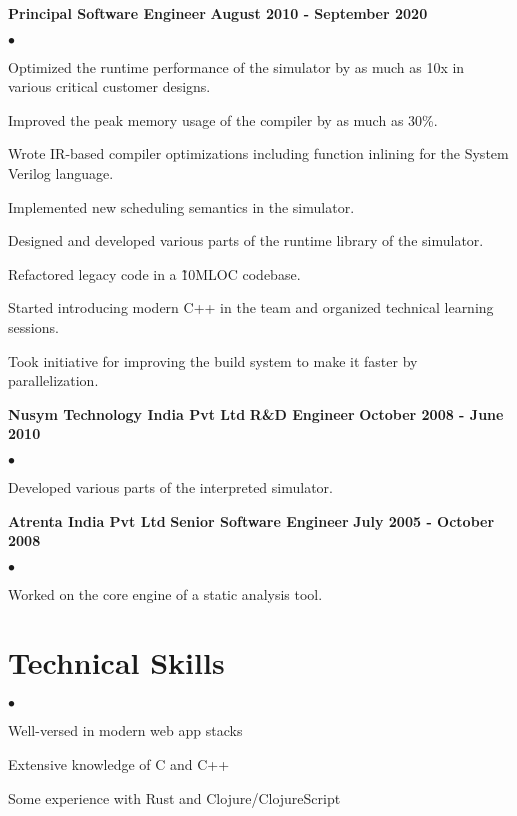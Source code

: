 \documentclass[margin,line]{res}
\newenvironment{list1}{
  \begin{list}{$\bullet$}{%
      \setlength{\itemsep}{0in}
      \setlength{\parsep}{0in} \setlength{\parskip}{0in}
      \setlength{\topsep}{0in} \setlength{\partopsep}{0in}
      \setlength{\leftmargin}{0.17in}}}{\end{list}}
\begin{document}
\begin{resume}
{\bf Principal Software Engineer}
\hfill{\bf August 2010 - September 2020} \\
\begin{list1} %
		\item Optimized the runtime performance of the simulator by as much as 10x in various critical customer designs.
		\item Improved the peak memory usage of the compiler by as much as 30\%.
		\item Wrote IR-based compiler optimizations including function inlining for the System Verilog language.
		\item Implemented new scheduling semantics in the simulator.
		\item Designed and developed various parts of the runtime library of the simulator.
		\item Refactored legacy code in a \~10MLOC codebase.
   		\item Started introducing modern C++ in the team and organized technical learning sessions.
   		\item Took initiative for improving the build system to make it faster by parallelization.
\end{list1}

{\bf  Nusym Technology India Pvt Ltd}
\hfill {\bf R\&D Engineer}
\hfill{\bf October 2008 - June 2010}
\vspace{.05in}
\begin{list1} %
	\item Developed various parts of the interpreted simulator.
\end{list1}
{\bf  Atrenta India Pvt Ltd}
\hfill {\bf Senior Software Engineer}
\hfill{\bf July 2005 - October 2008}
\vspace{.05in}
\begin{list1} %
\item Worked on the core engine of a static analysis tool.
\end{list1}

\section{\sc Technical Skills}
\begin{list1}
	\item Well-versed in modern web app stacks
	\item Extensive knowledge of C and C++
	\item Some experience with Rust and Clojure/ClojureScript
\end{list1}


\end{resume}
\end{document}

